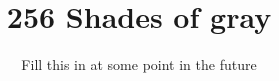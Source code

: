 \documentclass{report}
\begin{document}
\title{256 Shades of gray}
\author{Fill this in at some point in the future}

\maketitle

\begin{abstract}

\end{abstract}

\newpage
\tableofcontents
\newpage



\end{document}
